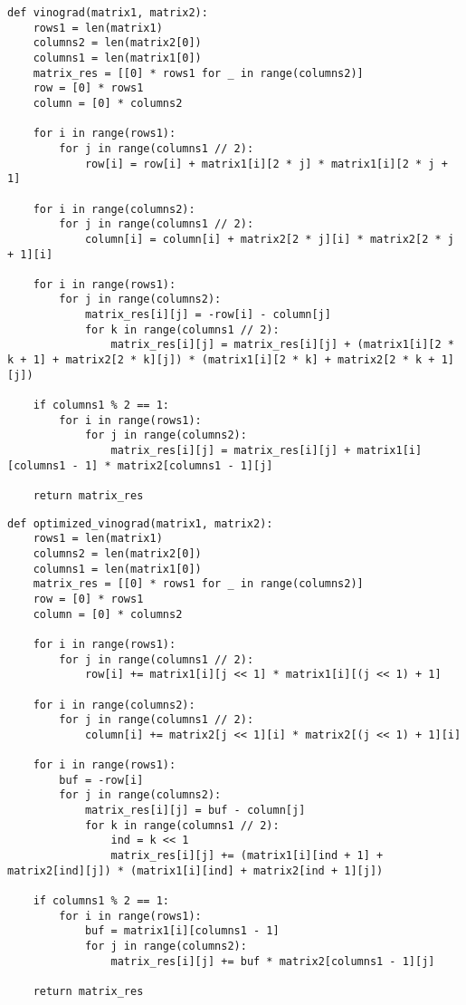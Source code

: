 \clearpage
\begin{center}
\captionsetup{justification=raggedright,singlelinecheck=off}
\begin{lstlisting}[label=lst:vinograd,caption=Алгоритм Винограда]
def vinograd(matrix1, matrix2):
    rows1 = len(matrix1)
    columns2 = len(matrix2[0])
    columns1 = len(matrix1[0])
    matrix_res = [[0] * rows1 for _ in range(columns2)]
    row = [0] * rows1
    column = [0] * columns2

    for i in range(rows1):
        for j in range(columns1 // 2):
            row[i] = row[i] + matrix1[i][2 * j] * matrix1[i][2 * j + 1]

    for i in range(columns2):
        for j in range(columns1 // 2):
            column[i] = column[i] + matrix2[2 * j][i] * matrix2[2 * j + 1][i]

    for i in range(rows1):
        for j in range(columns2):
            matrix_res[i][j] = -row[i] - column[j]
            for k in range(columns1 // 2):
                matrix_res[i][j] = matrix_res[i][j] + (matrix1[i][2 * k + 1] + matrix2[2 * k][j]) * (matrix1[i][2 * k] + matrix2[2 * k + 1][j])

    if columns1 % 2 == 1:
        for i in range(rows1):
            for j in range(columns2):
                matrix_res[i][j] = matrix_res[i][j] + matrix1[i][columns1 - 1] * matrix2[columns1 - 1][j]

    return matrix_res
\end{lstlisting}
\end{center}


\begin{center}
\captionsetup{justification=raggedright,singlelinecheck=off}
\begin{lstlisting}[label=lst:vinograd_opt,caption=Алгоритм Винограда с оптимизациями]
def optimized_vinograd(matrix1, matrix2):
    rows1 = len(matrix1)
    columns2 = len(matrix2[0])
    columns1 = len(matrix1[0])
    matrix_res = [[0] * rows1 for _ in range(columns2)]
    row = [0] * rows1
    column = [0] * columns2

    for i in range(rows1):
        for j in range(columns1 // 2):
            row[i] += matrix1[i][j << 1] * matrix1[i][(j << 1) + 1]

    for i in range(columns2):
        for j in range(columns1 // 2):
            column[i] += matrix2[j << 1][i] * matrix2[(j << 1) + 1][i]

    for i in range(rows1):
        buf = -row[i]
        for j in range(columns2):
            matrix_res[i][j] = buf - column[j]
            for k in range(columns1 // 2):
                ind = k << 1
                matrix_res[i][j] += (matrix1[i][ind + 1] + matrix2[ind][j]) * (matrix1[i][ind] + matrix2[ind + 1][j])

    if columns1 % 2 == 1:
        for i in range(rows1):
            buf = matrix1[i][columns1 - 1]
            for j in range(columns2):
                matrix_res[i][j] += buf * matrix2[columns1 - 1][j]

    return matrix_res
\end{lstlisting}
\end{center}

